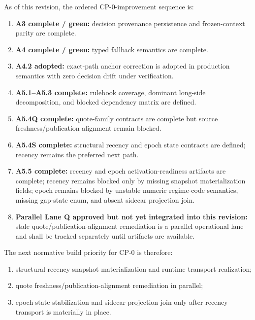 As of this revision, the ordered CP-0-improvement sequence is:
\begin{enumerate}[leftmargin=1.2cm]
    \item \textbf{A3 complete / green:} decision provenance persistence and frozen-context parity are complete.
    \item \textbf{A4 complete / green:} typed fallback semantics are complete.
    \item \textbf{A4.2 adopted:} exact-path anchor correction is adopted in production semantics with zero decision drift under verification.
    \item \textbf{A5.1--A5.3 complete:} rulebook coverage, dominant long-side decomposition, and blocked dependency matrix are defined.
    \item \textbf{A5.4Q complete:} quote-family contracts are complete but source freshness/publication alignment remain blocked.
    \item \textbf{A5.4S complete:} structural recency and epoch state contracts are defined; recency remains the preferred next path.
    \item \textbf{A5.5 complete:} recency and epoch activation-readiness artifacts are complete; recency remains blocked only by missing snapshot materialization fields; epoch remains blocked by unstable numeric regime-code semantics, missing gap-state enum, and absent sidecar projection join.
    \item \textbf{Parallel Lane Q approved but not yet integrated into this revision:} stale quote/publication-alignment remediation is a parallel operational lane and shall be tracked separately until artifacts are available.
\end{enumerate}

The next normative build priority for CP-0 is therefore:
\begin{enumerate}[leftmargin=1.2cm]
    \item structural recency snapshot materialization and runtime transport realization;
    \item quote freshness/publication-alignment remediation in parallel;
    \item epoch state stabilization and sidecar projection join only after recency transport is materially in place.
\end{enumerate}
